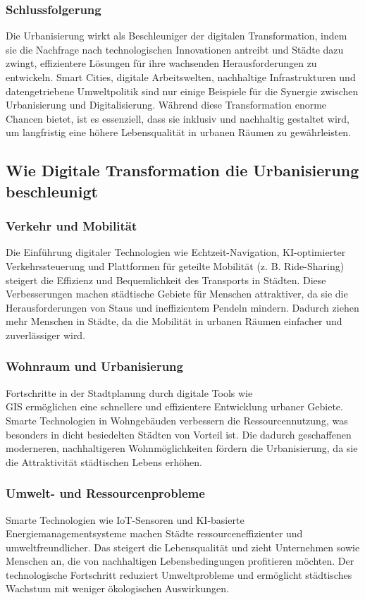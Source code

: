 \documentclass[conference,compsoc,final,a4paper, onecolumn, 11pt]{IEEEtran}
\begin{document}
\subsubsection{Schlussfolgerung}
Die Urbanisierung wirkt als Beschleuniger der digitalen Transformation, indem sie die Nachfrage nach technologischen Innovationen antreibt und Städte dazu zwingt, effizientere Lösungen für ihre wachsenden Herausforderungen zu entwickeln. 
Smart Cities, digitale Arbeitswelten, nachhaltige Infrastrukturen und datengetriebene Umweltpolitik sind nur einige Beispiele für die Synergie zwischen Urbanisierung und Digitalisierung. 
Während diese Transformation enorme Chancen bietet, ist es essenziell, dass sie inklusiv und nachhaltig gestaltet wird, um langfristig eine höhere Lebensqualität in urbanen Räumen zu gewährleisten.


\subsection{Wie Digitale Transformation die Urbanisierung beschleunigt}
\subsubsection{Verkehr und Mobilität}
Die Einführung digitaler Technologien wie Echtzeit-Navigation, \ac{KI}-optimierter Verkehrssteuerung und Plattformen für geteilte Mobilität (z. B. Ride-Sharing) steigert die Effizienz und Bequemlichkeit des Transports in Städten. 
Diese Verbesserungen machen städtische Gebiete für Menschen attraktiver, da sie die Herausforderungen von Staus und ineffizientem Pendeln mindern. 
Dadurch ziehen mehr Menschen in Städte, da die Mobilität in urbanen Räumen einfacher und zuverlässiger wird.\autocite{mckinsey_smart_cities}

\subsubsection{Wohnraum und Urbanisierung}
Fortschritte in der Stadtplanung durch digitale Tools wie \\ \ac{GIS} ermöglichen eine schnellere und effizientere Entwicklung urbaner Gebiete. 
Smarte Technologien in Wohngebäuden verbessern die Ressourcennutzung, was besonders in dicht besiedelten Städten von Vorteil ist. 
Die dadurch geschaffenen moderneren, nachhaltigeren Wohnmöglichkeiten fördern die Urbanisierung, da sie die Attraktivität städtischen Lebens erhöhen.\autocite{un_habitat_world_cities}

\subsubsection{Umwelt- und Ressourcenprobleme}
Smarte Technologien wie \ac{IoT}-Sensoren und \ac{KI}-basierte Energiemanagementsysteme machen Städte ressourceneffizienter und umweltfreundlicher. 
Das steigert die Lebensqualität und zieht Unternehmen sowie Menschen an, die von nachhaltigen Lebensbedingungen profitieren möchten. 
Der technologische Fortschritt reduziert Umweltprobleme und ermöglicht städtisches Wachstum mit weniger ökologischen Auswirkungen.\autocite{mdpi_smart_cities_iot}
\end{document}
